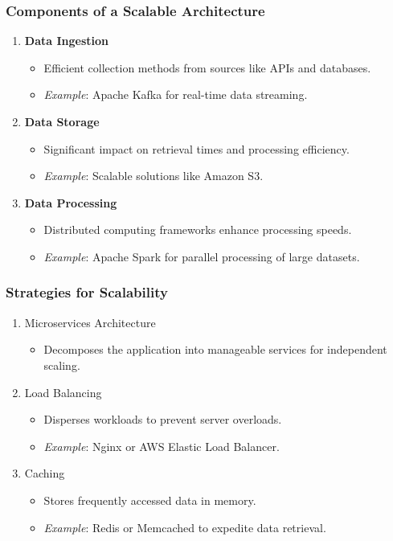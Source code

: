 \documentclass[aspectratio=169]{beamer}
\begin{document}
\begin{frame}[fragile]
    \frametitle{Components of a Scalable Architecture}
    \begin{enumerate}
        \item \textbf{Data Ingestion}
        \begin{itemize}
            \item Efficient collection methods from sources like APIs and databases.
            \item \textit{Example}: Apache Kafka for real-time data streaming.
        \end{itemize}
        
        \item \textbf{Data Storage}
        \begin{itemize}
            \item Significant impact on retrieval times and processing efficiency.
            \item \textit{Example}: Scalable solutions like Amazon S3.
        \end{itemize}
        
        \item \textbf{Data Processing}
        \begin{itemize}
            \item Distributed computing frameworks enhance processing speeds.
            \item \textit{Example}: Apache Spark for parallel processing of large datasets.
        \end{itemize}
    \end{enumerate}
\end{frame}

\begin{frame}[fragile]
    \frametitle{Strategies for Scalability}
    \begin{enumerate}
        \item Microservices Architecture
        \begin{itemize}
            \item Decomposes the application into manageable services for independent scaling.
        \end{itemize}
        
        \item Load Balancing
        \begin{itemize}
            \item Disperses workloads to prevent server overloads.
            \item \textit{Example}: Nginx or AWS Elastic Load Balancer.
        \end{itemize}
        
        \item Caching
        \begin{itemize}
            \item Stores frequently accessed data in memory.
            \item \textit{Example}: Redis or Memcached to expedite data retrieval.
        \end{itemize}
    \end{enumerate}
\end{frame}
\end{document}
